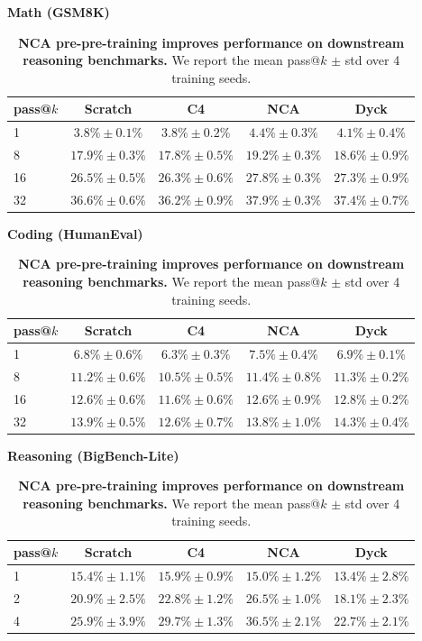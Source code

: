 \documentclass{article}
\theoremstyle{plain}
\theoremstyle{definition}
\theoremstyle{remark}
\begin{document}
\begin{table}[ht]
\centering
\scriptsize %
\setlength{\tabcolsep}{3pt} %
\renewcommand{\arraystretch}{1.2}
\textbf{Math (GSM8K)} \\
\begin{tabular}{l c c c c}
\toprule
\textbf{pass@$k$} & \textbf{Scratch} & \textbf{C4} & \textbf{NCA} & \textbf{Dyck} \\
\midrule
1   & $3.8\%\pm 0.1\%$ & $3.8\% \pm 0.2\%$ & $\mathbf{4.4\% \pm 0.3\%}$ & $4.1\% \pm 0.4\%$ \\
8   & $17.9\% \pm 0.3\%$ & $17.8\% \pm 0.5\%$ & $\mathbf{19.2\% \pm 0.3\%}$ & $18.6\% \pm 0.9\%$ \\
16  & $26.5\% \pm 0.5\%$ & $26.3\% \pm 0.6\%$ & $\mathbf{27.8\% \pm 0.3\%}$ & $27.3\% \pm 0.9\%$ \\
32  & $36.6\% \pm 0.6\%$ & $36.2\% \pm 0.9\%$ & $\mathbf{37.9\% \pm 0.3\%}$ & $37.4\% \pm 0.7\%$ \\
\bottomrule
\end{tabular}
\textbf{Coding (HumanEval)} \\
\begin{tabular}{l c c c c}
\toprule
\textbf{pass@$k$} & \textbf{Scratch} & \textbf{C4} & \textbf{NCA} & \textbf{Dyck} \\
\midrule
1   & $6.8\% \pm 0.6\%$ & $6.3\% \pm 0.3\%$ & $\mathbf{7.5\% \pm 0.4\%}$ & $6.9\% \pm 0.1\%$ \\
8   & $11.2\% \pm 0.6\%$ & $10.5\% \pm 0.5\%$ & $\mathbf{11.4\% \pm 0.8\%}$ & $11.3\% \pm 0.2\%$ \\
16  & ${12.6\% \pm 0.6\%}$ & $11.6\% \pm 0.6\%$ & $12.6\% \pm 0.9\%$ & $\mathbf{12.8\% \pm 0.2\%}$ \\
32  & ${13.9\% \pm 0.5\%}$ & $12.6\% \pm 0.7\%$ & $13.8\% \pm 1.0\%$ & $\mathbf{14.3\% \pm 0.4\%}$ \\
\bottomrule
\end{tabular}
\textbf{Reasoning (BigBench-Lite)} \\
\begin{tabular}{l c c c c}
\toprule
\textbf{pass@$k$} & \textbf{Scratch} & \textbf{C4} & \textbf{NCA} & \textbf{Dyck} \\
\midrule
1 & $15.4\% \pm 1.1\%$ & $\mathbf{15.9\% \pm 0.9\%}$ & $15.0\% \pm 1.2\%$ & $13.4\% \pm 2.8\%$ \\
2 & $20.9\% \pm 2.5\%$ & $22.8\% \pm 1.2\%$ & $\mathbf{26.5\% \pm 1.0\%}$ & $18.1\% \pm 2.3\%$ \\
4 & $25.9\% \pm 3.9\%$ & $29.7\% \pm 1.3\%$ & $\mathbf{36.5\% \pm 2.1\%}$ & $22.7\% \pm 2.1\%$ \\
\bottomrule
\end{tabular}
\caption{\textbf{NCA pre-pre-training improves performance on downstream reasoning benchmarks.} We report the mean pass@$k$ $\pm$ std over 4 training seeds.}
\label{table:passk-all}
\end{table}
\end{document}
